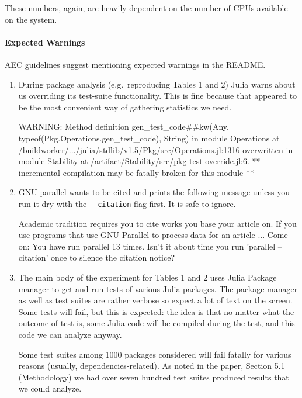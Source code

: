 \documentclass[
]{article}
\begin{document}
These numbers, again, are heavily dependent on the number of CPUs
available on the system.

\hypertarget{expected-warnings}{%
\paragraph{Expected Warnings}\label{expected-warnings}}

AEC guidelines suggest mentioning expected warnings in the README.

\begin{enumerate}
\def\labelenumi{\arabic{enumi}.}
\item
  During package analysis (e.g.~reproducing Tables 1 and 2) Julia warns
  about us overriding its test-suite functionality. This is fine because
  that appeared to be the most convenient way of gathering statistics we
  need.

\begin{verbnobox}[\small]
WARNING: Method definition gen_test_code##kw(Any, typeof(Pkg.Operations.gen_test_code), String)
  in module Operations at /buildworker/.../julia/stdlib/v1.5/Pkg/src/Operations.jl:1316
  overwritten in module Stability at /artifact/Stability/src/pkg-test-override.jl:6.
  ** incremental compilation may be fatally broken for this module **
\end{verbnobox}
\item
  GNU parallel wants to be cited and prints the following message unless
  you run it dry with the \texttt{-\/-citation} flag first. It is safe
  to ignore.

\begin{verbnobox}[\small]
Academic tradition requires you to cite works you base your article on.
If you use programs that use GNU Parallel to process data for an article
...
Come on: You have run parallel 13 times. Isn't it about time 
you run 'parallel --citation' once to silence the citation notice?
\end{verbnobox}
\item
  The main body of the experiment for Tables 1 and 2 uses Julia Package
  manager to get and run tests of various Julia packages. The package
  manager as well as test suites are rather verbose so expect a lot of
  text on the screen. Some tests will fail, but this is expected: the
  idea is that no matter what the outcome of test is, some Julia code
  will be compiled during the test, and this code we can analyze anyway.

  Some test suites among 1000 packages considered will fail fatally for
  various reasons (usually, dependencies-related). As noted in the
  paper, Section 5.1 (Methodology) we had over seven hundred test suites
  produced results that we could analyze.
\end{enumerate}
\end{document}
